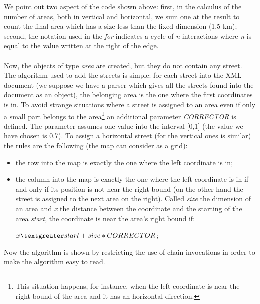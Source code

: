 \documentclass[\mainpath/main]{subfiles}
\begin{document}
We point out two aspect of the code shown above: first, in the calculus of the number of areas, both in vertical and horizontal, we sum one at the result to count the final area which has a size less than the fixed dimension (1.5 km); second, the notation used in the \textit{for} indicates a cycle of \textit{n} interactions where \textit{n} is equal to the value written at the right of the edge.\\
\\
Now, the objects of type \textit{area} are created, but they do not contain any street. The algorithm used to add the streets is simple: for each street into the XML document (we suppose we have a parser which gives all the streets found into the document as an object), the belonging area is the one where the first coordinates is in. To avoid strange situations where a street is assigned to an area even if only a small part belongs to the area\footnote{This situation happens, for instance, when the left coordinate is near the right bound of the area and it has an horizontal direction.} an additional parameter \textit{CORRECTOR} is defined. The parameter assumes one value into the interval [0,1] (the value we have chosen is 0.7). To assign a horizontal street (for the vertical ones is similar) the rules are the following (the map can consider as a grid):
\begin{itemize}
	\item the row into the map is exactly the one where the left coordinate is in;
	\item the column into the map is exactly the one where the left coordinate is in if and only if its position is not near the right bound (on the other hand the street is assigned to the next area on the right). Called \textit{size} the dimension of an area and \textit{x} the distance between the coordinate and the starting of the area \textit{start}, the coordinate is near the area's right bound if:
	\begin{center}
		$ x \textgreater start + size * CORRECTOR $;
	\end{center}
\end{itemize}
Now the algorithm is shown by restricting the use of chain invocations in order to make the algorithm easy to read.\\
\end{document}
